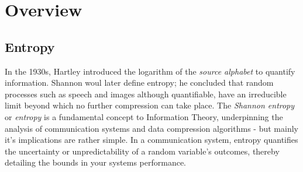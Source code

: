 \documentclass[12pt]{article}
\begin{document}
	
	\section{Overview }

	\subsection{Entropy}
	In the 1930s, Hartley introduced the logarithm of the \emph{source alphabet} to quantify information. Shannon woul later define entropy; he concluded that random processes such as speech and images although quantifiable, have an irreducible limit beyond which no further compression can take place. The  \emph{Shannon entropy} or \emph{entropy} is a fundamental concept to Information Theory, underpinning the analysis of communication systems and data compression algorithms - but mainly it's implications  are rather simple. In a communication system, entropy quantifies the uncertainty or unpredictability of a random variable's outcomes, thereby detailing the bounds in  your systems performance. 
	
\end{document}
